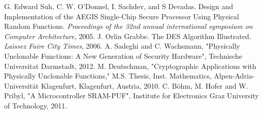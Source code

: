 \documentclass[letterpaper, 10 pt, conference]{ieeeconf}  %
\begin{document}









\begin{thebibliography}{99}

 G. Edward Suh, C. W. O'Donnel, I. Sachdev, and S Devadas. Design and Implementation of the AEGIS Single-Chip Secure Processor Using Physical Random Functions. \emph{Proceedings of the 32nd annual international symposium on Computer Architecture}, 2005.
 J. Orlin Grabbe. The DES Algorithm Illustrated. \emph{Laissez Faire City Times}, 2006.
 A. Sadeghi and C. Wachsmann, "Physically Unclonable Functions: A New Generation of Security Hardware", Technische Universitat Darmstadt, 2012.
 M. Deutschman, "Cryptographic Applications with Physically Unclonable Functions," M.S. Thesis, Inst. Mathematics, Alpen-Adria-Universit\"{a}t Klagenfurt, Klagenfurt, Austria, 2010.
 C. Böhm, M. Hofer and W. Pribyl, "A Microcontroller SRAM-PUF", Institute for Electronics Graz University of Technology, 2011.
 
\end{thebibliography}
\end{document}
